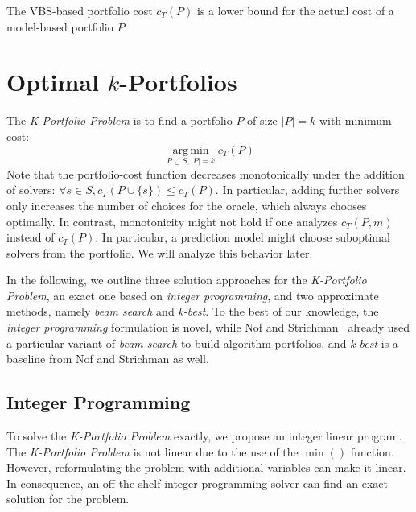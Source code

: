 \documentclass[a4paper,USenglish,pdfa]{lipics-v2021} %
\DeclareMathOperator*{\argmin}{arg\,min}
\begin{document}
The VBS-based portfolio cost $c_{T}(P)$ is a lower bound for the actual cost of a model-based portfolio $P$.

\section{Optimal \texorpdfstring{$k$}{k}-Portfolios} %
\label{sec:approach}

The \emph{K-Portfolio Problem} is to find a portfolio $P$ of size $|P| = k$ with minimum cost:%
\[
\argmin\limits_{P \subseteq S, |P| = k} c_{T}(P)
\]
Note that the portfolio-cost function decreases monotonically under the addition of solvers: $\forall s \in S, c_{T}(P \cup \{s\}) \leq c_{T}(P)$. 
In particular, adding further solvers only increases the number of choices for the oracle, which always chooses optimally.
In contrast, monotonicity might not hold if one analyzes $c_{T}(P,m)$ instead of $c_{T}(P)$.
In particular, a prediction model might choose suboptimal solvers from the portfolio.
We will analyze this behavior later.

In the following, we outline three solution approaches for the \emph{K-Portfolio Problem}, an exact one based on \emph{integer programming}, and two approximate methods, namely \emph{beam search} and \emph{k-best}. 
To the best of our knowledge, the \emph{integer programming} formulation is novel,
while Nof and Strichman~\cite{nof2020real} already used a particular variant of \emph{beam search} to build algorithm portfolios,
and \emph{k-best} is a baseline from Nof and Strichman as well.

\subsection{Integer Programming}
\label{sec:approach:ip}

To solve the \emph{K-Portfolio Problem} exactly, we propose an integer linear program.
The \emph{K-Portfolio Problem} is not linear due to the use of the $\min()$ function.
However, reformulating the problem with additional variables can make it linear.
In consequence, an off-the-shelf integer-programming solver can find an exact solution for the problem.
\end{document}
